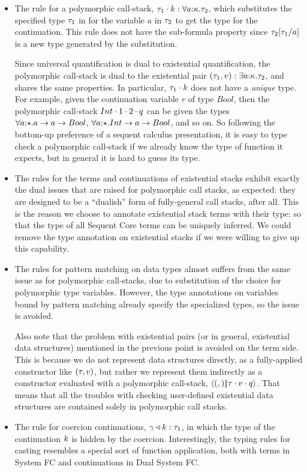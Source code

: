 \documentclass{article}
\begin{document}
\begin{itemize}
\item The rule for a polymorphic call-stack,
  ${\tau_1}\cdot{k} : \forall a{:}{\kappa}.\tau_2$, which substitutes the
  specified type $\tau_1$ in for the variable $a$ in $\tau_2$ to get the type for
  the continuation.  This rule does not have the sub-formula property since
  $\tau_2[\tau_1/a]$ is a new type generated by the substitution.

  Since universal quantification is dual to existential quantification, the
  polymorphic call-stack is dual to the existential pair
  $(\tau_1,v) : \exists a{:}{\kappa}.\tau_2$, and shares the same properties.
  In particular, ${\tau_1}\cdot{k}$ does not have a \emph{unique} type.  For
  example, given the continuation variable $r$ of type $Bool$, then the
  polymorphic call-stack ${Int}\cdot{{1}\cdot{{2}\cdot{q}}}$ can be given the types
  $\forall a{:}{\star}. a \to a \to Bool$,
  $\forall a{:}{\star}. Int \to a \to Bool$, and so on.  So following the
  bottom-up preference of a sequent calculus presentation, it is easy to type
  check a polymorphic call-stack if we already know the type of function it
  expects, but in general it is hard to guess its type.

\item The rules for the terms and continuations of existential stacks exhibit
  exactly the dual issues that are raised for polymorphic call stacks, as
  expected: they are designed to be a ``dualish'' form of fully-general call
  stacks, after all.  This is the reason we choose to annotate existential stack
  terms with their type: so that the type of all Sequent Core terms can be
  uniquely inferred.  We could remove the type annotation on existential stacks
  if we were willing to give up this capability.

\item The rules for pattern matching on data types almost suffers from the same
  issue as for polymorphic call-stacks, due to substitution of the choice for
  polymorphic type variables.  However, the type annotations on variables bound
  by pattern matching already specify the specialized types, so the issue is
  avoided.

  Also note that the problem with existential pairs (or in general, existential
  data structures) mentioned in the previous point is avoided on the term side.
  This is because we do not represent data structures directly, as a
  fully-applied constructor like $(\tau, v)$, but rather we represent them
  indirectly as a constructor evaluated with a polymorphic call-stack,
  $\left\langle{(,)}\middle|\!\middle|{{\tau}\cdot{{v}\cdot{q}}}\right\rangle$.  That means that all the troubles with
  checking user-defined existential data structures are contained solely in
  polymorphic call stacks.

\item The rule for coercion continuations, ${\gamma}\triangleleft{k} : \tau_1$, in which
  the type of the continuation $k$ is hidden by the coercion.  Interestingly,
  the typing rules for casting resembles a special sort of function application,
  both with terms in System FC and continuations in Dual System FC.
\end{itemize}
\end{document}
